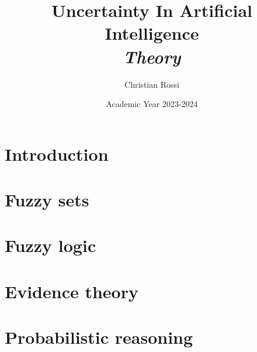 \documentclass[12pt, a4paper]{report}
\title{Uncertainty In Artificial Intelligence \\ \textit{Theory}}
\author{Christian Rossi}
\date{Academic Year 2023-2024}
\begin{document}
    \maketitle

    

    \cleardoublepage

    \tableofcontents

    \cleardoublepage

    \chapter{Introduction}

    
    
      
    
    
    
    \chapter{Fuzzy sets}
     
    

    \chapter{Fuzzy logic}
    
    
    
    
    
    
    
    
    

    \chapter{Evidence theory}
    
    
    
    
    

    \chapter{Probabilistic reasoning}
    
    
    
\end{document}
